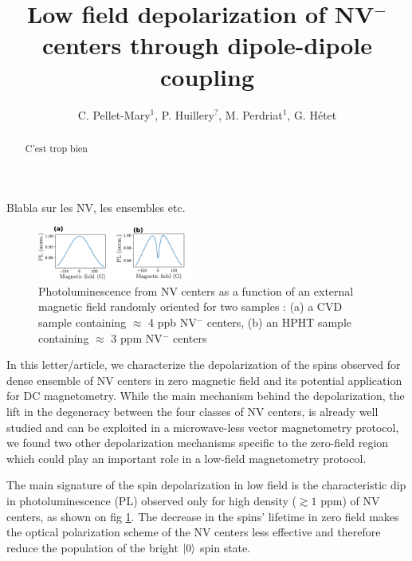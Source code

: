 \documentclass[preprintnumbers,amsmath,amssymb,superscriptaddress,twocolumn,showpacs]{revtex4-2}
\begin{document}
\title{Low field depolarization of NV$^-$ centers through dipole-dipole coupling}

\author{C. Pellet-Mary$^1$, P. Huillery$^?$,  M. Perdriat$^1$, G. H\'etet} 


\begin{abstract}
C'est trop bien
\end{abstract}

\maketitle
Blabla sur les NV, les ensembles etc.




\begin{figure}
\includegraphics[width=0.45\textwidth]{Figures/fig dense vs pas dense}
\caption{Photoluminescence from NV centers as a function of an external magnetic field randomly oriented for two samples : (a) a CVD sample containing $\approx$ 4 ppb NV$^-$ centers, (b) an HPHT sample containing $\approx$ 3 ppm NV$^-$ centers}
\label{PL_NV_density}
\end{figure}

In this letter/article, we characterize the depolarization of the spins observed for dense ensemble of NV centers in zero magnetic field and its potential application for DC magnetometry. While the main mechanism behind the depolarization, the lift in the degeneracy between the four classes of NV centers, is already well studied and can be exploited in a microwave-less vector magnetometry protocol, we found two other depolarization mechanisms specific to the zero-field region which could play an important role in a low-field magnetometry protocol.

The main signature of the spin depolarization in low field is the characteristic dip in photoluminescence (PL) observed only for high density ($\gtrsim 1$ ppm) of NV centers, as shown on fig \ref{PL_NV_density}. The decrease in the spins' lifetime in zero field makes the optical polarization scheme of the NV centers less effective and therefore reduce the population of the bright $\ket{0}$ spin state. %
\end{document}
